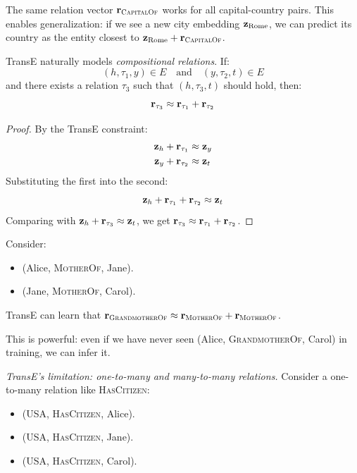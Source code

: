 \begin{notechapter}
\begin{example}
The same relation vector $\mathbf{r}_{\textsc{CapitalOf}}$ works for all capital-country pairs. This enables generalization: if we see a new city embedding $\mathbf{z}_{\text{Rome}}$, we can predict its country as the entity closest to $\mathbf{z}_{\text{Rome}} + \mathbf{r}_{\textsc{CapitalOf}}$.
\end{example}

\begin{proposition}
TransE naturally models \emph{compositional relations}. If:
\[
(h, \tau_1, y) \in E \quad \text{and} \quad (y, \tau_2, t) \in E
\]
and there exists a relation $\tau_3$ such that $(h, \tau_3, t)$ should hold, then:
\[
\mathbf{r}_{\tau_3} \approx \mathbf{r}_{\tau_1} + \mathbf{r}_{\tau_2}
\]
\end{proposition}

\begin{proof}
By the TransE constraint:
\begin{align*}
\mathbf{z}_h + \mathbf{r}_{\tau_1} &\approx \mathbf{z}_y \\
\mathbf{z}_y + \mathbf{r}_{\tau_2} &\approx \mathbf{z}_t
\end{align*}
Substituting the first into the second:
\[
\mathbf{z}_h + \mathbf{r}_{\tau_1} + \mathbf{r}_{\tau_2} \approx \mathbf{z}_t
\]
Comparing with $\mathbf{z}_h + \mathbf{r}_{\tau_3} \approx \mathbf{z}_t$, we get $\mathbf{r}_{\tau_3} \approx \mathbf{r}_{\tau_1} + \mathbf{r}_{\tau_2}$.
\end{proof}

\begin{example}
Consider:
\begin{itemize}
    \item (Alice, \textsc{MotherOf}, Jane).
    \item (Jane, \textsc{MotherOf}, Carol).
\end{itemize}
TransE can learn that $\mathbf{r}_{\textsc{GrandmotherOf}} \approx \mathbf{r}_{\textsc{MotherOf}} + \mathbf{r}_{\textsc{MotherOf}}$.

This is powerful: even if we have never seen (Alice, \textsc{GrandmotherOf}, Carol) in training, we can infer it.
\end{example}

\begin{keyidea}
\emph{TransE's limitation: one-to-many and many-to-many relations.}
Consider a one-to-many relation like \textsc{HasCitizen}:
\begin{itemize}
    \item (USA, \textsc{HasCitizen}, Alice).
    \item (USA, \textsc{HasCitizen}, Jane).
    \item (USA, \textsc{HasCitizen}, Carol).
\end{itemize}


\end{keyidea}
\end{notechapter}
